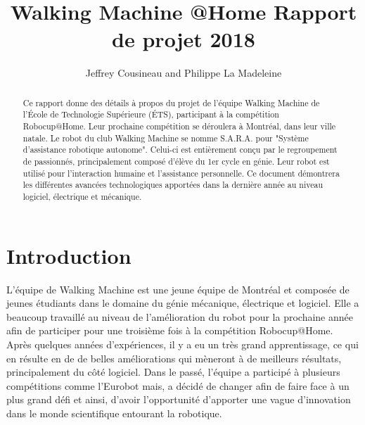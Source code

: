 \documentclass[runningheads,a4paper]{llncs}
\begin{document}


\newif\ifdraft
\draftfalse


\ifdraft
\setlength{\belowcaptionskip}{-5pt}
\fi

\title{Walking Machine @Home \newline \: Rapport de projet 2018}

\author{Jeffrey Cousineau and Philippe La Madeleine}
\maketitle



\begin{abstract}
Ce rapport donne des détails à propos du projet de l'équipe Walking Machine de l'École de Technologie Supérieure (ÉTS), participant à la compétition Robocup@Home.  Leur prochaine compétition se déroulera à Montréal, dans leur ville natale. Le robot du club Walking Machine se nomme S.A.R.A. pour "Système d'assistance robotique autonome". Celui-ci est entièrement conçu par le regroupement de passionnés, principalement composé d'élève du 1er cycle en génie. Leur robot est utilisé pour l'interaction humaine et l'assistance personnelle. Ce document démontrera les différentes avancées technologiques apportées dans la dernière année au niveau logiciel, électrique et mécanique.

\end{abstract}


\section{Introduction}

L'équipe de Walking Machine est une jeune équipe de Montréal et composée de jeunes étudiants dans le domaine du génie mécanique, électrique et logiciel. Elle a beaucoup travaillé au niveau de l'amélioration du robot pour la prochaine année afin de participer pour une troisième fois à la compétition Robocup@Home. Après quelques années d'expériences, il y a eu un très grand apprentissage, ce qui en résulte en de de belles améliorations qui mèneront à de meilleurs résultats, principalement du côté logiciel. Dans le passé, l'équipe a participé à plusieurs compétitions comme l'Eurobot mais, a décidé de changer afin de faire face à un plus grand défi et ainsi, d'avoir l'opportunité d'apporter une vague d'innovation dans le monde scientifique entourant la robotique. \\
\end{document}
